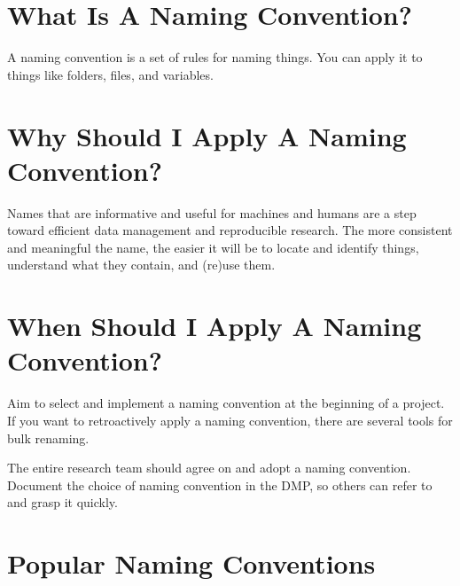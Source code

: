 \documentclass[
  letterpaper,
  DIV=11,
  numbers=noendperiod]{scrreprt}
\begin{document}
\section*{What Is A Naming
Convention?}\label{what-is-a-naming-convention}


A naming convention is a set of rules for naming things. You can apply
it to things like folders, files, and variables.

\section*{Why Should I Apply A Naming
Convention?}\label{why-should-i-apply-a-naming-convention}


Names that are informative and useful for machines and humans are a step
toward efficient data management and reproducible research. The more
consistent and meaningful the name, the easier it will be to locate and
identify things, understand what they contain, and (re)use them.

\section*{When Should I Apply A Naming
Convention?}\label{when-should-i-apply-a-naming-convention}


Aim to select and implement a naming convention at the beginning of a
project. If you want to retroactively apply a naming convention, there
are several tools for bulk renaming.

The entire research team should agree on and adopt a naming convention.
Document the choice of naming convention in the DMP, so others can refer
to and grasp it quickly.

\section*{Popular Naming Conventions}\label{popular-naming-conventions}

\end{document}

